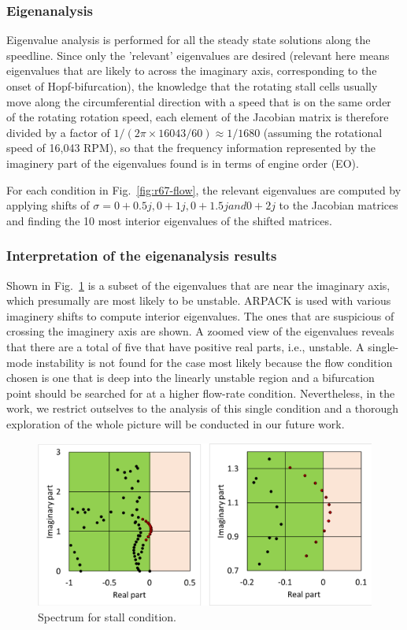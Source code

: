 \documentclass[journal,final]{new-aiaa}
\begin{document}
\subsubsection{Eigenanalysis}
Eigenvalue analysis is performed for all the steady state solutions along the
speedline. Since only the 'relevant' eigenvalues are desired (relevant here
means eigenvalues that are likely to across the imaginary axis, corresponding
to the onset of Hopf-bifurcation), the knowledge that the rotating stall cells
usually move along the circumferential direction with a speed that is on the
same order of the rotating rotation speed, each element of the Jacobian
matrix is therefore divided by a factor of $1/(2\pi \times 16043 / 60)\approx 1/1680$ (assuming
the rotational speed of 16,043 RPM),
so that the frequency information represented by the imaginery part of the
eigenvalues found is in terms of engine order (EO).

For each condition in Fig.~\ref{fig:r67-flow}, the relevant eigenvalues are computed
by applying shifts of $\sigma= 0+0.5j, 0+1j, 0+1.5j and 0+2j$ to the Jacobian matrices and
finding the 10 most interior eigenvalues of the shifted matrices.


\subsubsection{Interpretation of the eigenanalysis results}

Shown in Fig.~\ref{fig:r67-eigenvalue-18kpa} is a subset of the eigenvalues
that are near the imaginary axis, which presumally are most likely to
be unstable. ARPACK is used with various imaginery shifts to compute
interior eigenvalues. The ones that are suspicious of crossing the
imaginery axis are shown. A zoomed view of the eigenvalues reveals
that there are a total of five that have positive real parts, i.e., unstable.
A single-mode instability is not found for the case most likely because
the flow condition chosen is one that is deep into the linearly unstable
region and a bifurcation point should be searched for at a higher flow-rate
condition. Nevertheless, in the work, we restrict outselves to the analysis
of this single condition and a thorough exploration of the whole picture will
be conducted in our future work.


\begin{figure}[htb]
	\centering   
	\includegraphics[width=.7\textwidth]{pic/rotor67-18kpa-spectrum.png}	
	\caption{Spectrum for stall condition.}
	\label{fig:r67-eigenvalue-18kpa}
\end{figure}
\end{document}
